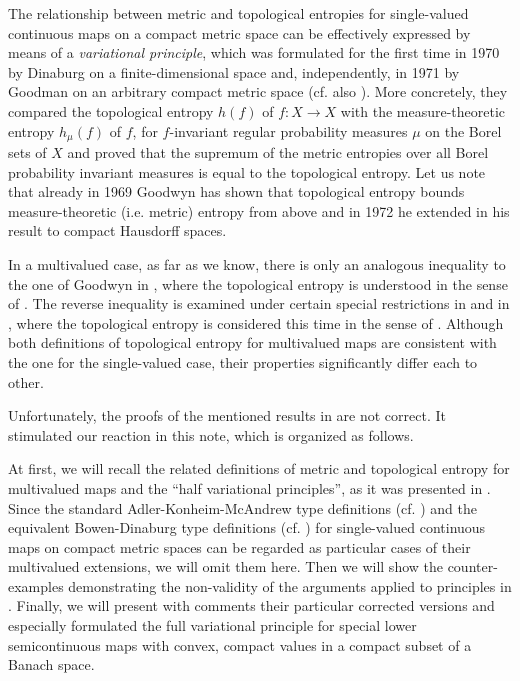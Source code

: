 \documentclass[12pt]{amsart}
\theoremstyle{definition}
\begin{document}
The relationship between metric and topological entropies for single-valued continuous maps on a compact metric space can be effectively expressed by means of a \emph{variational principle}, which was formulated for the first time in 1970 by Dinaburg \cite{Di} on a finite-dimensional space and, independently, in 1971 by Goodman \cite{Go3} on an arbitrary compact metric space (cf. also \cite{Mi}). More concretely, they compared the topological entropy $h(f)$ of $f:X\to X$ with the measure-theoretic entropy $h_{\mu}(f)$ of $f$, for $f$-invariant regular probability measures $\mu$ on the Borel sets of $X$ and proved that the supremum of the metric entropies over all Borel probability invariant measures is equal to the topological entropy. Let us note that already in 1969 Goodwyn \cite{Go1} has shown that topological entropy bounds measure-theoretic (i.e. metric) entropy from above and in 1972 he extended in \cite{Go2} his result to compact Hausdorff spaces.

In a multivalued case, as far as we know, there is only an analogous inequality to the one of Goodwyn in \cite[Theorem 3.2]{VS}, where the topological entropy is understood in the sense of \cite{KT}. The reverse inequality is examined under certain special restrictions in \cite[Theorem 3.7]{VS} and in \cite[Theorem 1.4]{CMM2}, where the topological entropy is considered this time in the sense of \cite{CMM1}. Although both definitions of topological entropy for multivalued maps are consistent with the one for the single-valued case, their properties significantly differ each to other.

Unfortunately, the proofs of the mentioned results in \cite[Theorems 3.2 and 3.7]{VS} are not correct. It stimulated our reaction in this note, which is organized as follows.

At first, we will recall the related definitions of metric and topological entropy for multivalued maps and the ``half variational principles'', as it was presented in \cite{VS}. Since the standard Adler-Konheim-McAndrew type definitions (cf. \cite{AKM}) and the equivalent Bowen-Dinaburg type definitions (cf. \cite{Bo,Di}) for single-valued continuous maps on compact metric spaces can be regarded as particular cases of their multivalued extensions, we will omit them here. Then we will show  the counter-examples demonstrating the non-validity of the arguments applied to principles in \cite{VS}. Finally, we will present with comments their particular corrected versions and especially formulated the full variational principle for special lower semicontinuous maps with convex, compact values in a compact subset of a Banach space.
\end{document}
